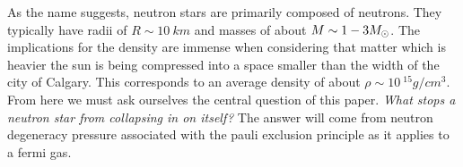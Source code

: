 As the name suggests, neutron stars are primarily composed of neutrons. They typically have radii of $R\sim\qty{10}{km}$ and masses of about $M\sim 1-3M_\odot$\cite{shapiro_teukolsky_1983}. The implications for the density are immense when considering that matter which is heavier the sun is being compressed into a space smaller than the width of the city of Calgary. This corresponds to an average density of about $\rho \sim \qty{10}{^{15}g/cm^{3}}$. From here we must ask ourselves the central question of this paper. \textit{What stops a neutron star from collapsing in on itself?} The answer will come from neutron degeneracy pressure associated with the pauli exclusion principle as it applies to a fermi gas.